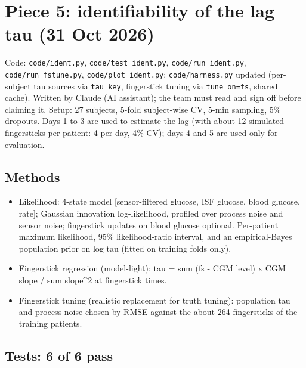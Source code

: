 \documentclass[11pt,a4paper]{article}
\providecommand{\tightlist}{\setlength{\itemsep}{0pt}\setlength{\parskip}{0pt}}
\begin{document}
\hypertarget{piece-5-identifiability-of-the-lag-tau-31-oct-2026}{%
\section{Piece 5: identifiability of the lag tau (31 Oct
2026)}\label{piece-5-identifiability-of-the-lag-tau-31-oct-2026}}

Code: \texttt{code/ident.py}, \texttt{code/test\_ident.py},
\texttt{code/run\_ident.py}, \texttt{code/run\_fstune.py},
\texttt{code/plot\_ident.py}; \texttt{code/harness.py} updated
(per-subject tau sources via \texttt{tau\_key}, fingerstick tuning via
\texttt{tune\_on=\textquotesingle{}fs\textquotesingle{}}, shared cache).
Written by Claude (AI assistant); the team must read and sign off before
claiming it. Setup: 27 subjects, 5-fold subject-wise CV, 5-min sampling,
5\% dropouts. Days 1 to 3 are used to estimate the lag (with about 12
simulated fingersticks per patient: 4 per day, 4\% CV); days 4 and 5 are
used only for evaluation.

\hypertarget{methods}{%
\subsection{Methods}\label{methods}}

\begin{itemize}
\tightlist
\item
  Likelihood: 4-state model {[}sensor-filtered glucose, ISF glucose,
  blood glucose, rate{]}; Gaussian innovation log-likelihood, profiled
  over process noise and sensor noise; fingerstick updates on blood
  glucose optional. Per-patient maximum likelihood, 95\%
  likelihood-ratio interval, and an empirical-Bayes population prior on
  log tau (fitted on training folds only).
\item
  Fingerstick regression (model-light): tau = sum (fs - CGM level) x CGM
  slope / sum slope\^{}2 at fingerstick times.
\item
  Fingerstick tuning (realistic replacement for truth tuning):
  population tau and process noise chosen by RMSE against the about 264
  fingersticks of the training patients.
\end{itemize}

\hypertarget{tests-6-of-6-pass}{%
\subsection{Tests: 6 of 6 pass}\label{tests-6-of-6-pass}}
\end{document}
